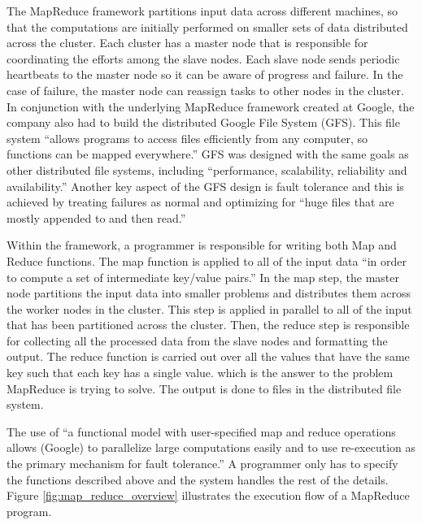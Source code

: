 \documentclass{article}
\begin{document}
The MapReduce framework partitions input data across different machines, so that
the computations are initially performed on smaller sets of data distributed
across the cluster. Each cluster has a master node that is responsible for
coordinating the efforts among the slave nodes. Each slave node sends periodic
heartbeats to the master node so it can be aware of progress and failure. In the
case of failure, the master node can reassign tasks to other nodes in the cluster.
In conjunction with the underlying MapReduce framework created at Google, the
company also had to build the distributed Google File System (GFS). This file
system ``allows programs to access files efficiently from any computer, so
functions can be mapped everywhere.'' GFS was designed with the same goals as
other distributed file systems, including ``performance, scalability, reliability
and availability.'' Another key aspect of the GFS design is fault tolerance and
this is achieved by treating failures as normal and optimizing for ``huge files
that are mostly appended to and then read.''

Within the framework, a programmer is responsible for writing both Map and Reduce
functions. The map function is applied to all of the input data ``in order to
compute a set of intermediate key/value pairs.'' In the map step, the master node
partitions the input data into smaller problems and distributes them across the
worker nodes in the cluster. This step is applied in parallel to all of the input
that has been partitioned across the cluster. Then, the reduce step is responsible
for collecting all the processed data from the slave nodes and formatting the
output. The reduce function is carried out over all the values that have the same
key such that each key has a single value. which is the answer to the problem
MapReduce is trying to solve. The output is done to files in the distributed file
system.

The use of ``a functional model with user-specified map and reduce operations
allows (Google) to parallelize large computations easily and to use re-execution
as the primary mechanism for fault tolerance.'' A programmer only has to specify
the functions described above and the system handles the rest of the details.
Figure \ref{fig:map_reduce_overview} illustrates the execution flow of a MapReduce
program.
\end{document}

